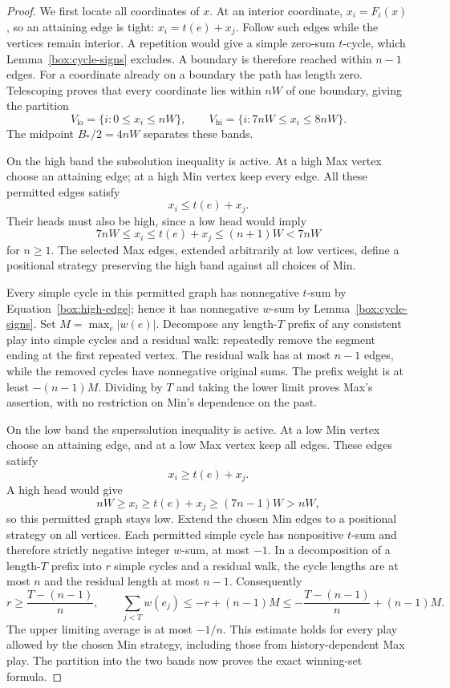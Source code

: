 \begin{proof}
We first locate all coordinates of $x$. At an interior coordinate,
$x_i=F_i(x)$, so an attaining edge is tight: $x_i=t(e)+x_j$. Follow
such edges while the vertices remain interior. A repetition would give
a simple zero-sum $t$-cycle, which Lemma~\ref{box:cycle-signs} excludes.
A boundary is therefore reached within $n-1$ edges. For a coordinate
already on a boundary the path has length zero. Telescoping proves that
every coordinate lies within $nW$ of one boundary, giving the partition
\begin{equation}\label{box:bands}
 V_{\mathrm{lo}}=\{i:0\le x_i\le nW\},\qquad
 V_{\mathrm{hi}}=\{i:7nW\le x_i\le8nW\}.
\end{equation}
The midpoint $B_*/2=4nW$ separates these bands.

On the high band the subsolution inequality is active. At a high Max
vertex choose an attaining edge; at a high Min vertex keep every edge.
All these permitted edges satisfy
\begin{equation}\label{box:high-edge}
 x_i\le t(e)+x_j.
\end{equation}
Their heads must also be high, since a low head would imply
\[
 7nW\le x_i\le t(e)+x_j\le(n+1)W<7nW
\]
for $n\ge1$. The selected Max edges, extended arbitrarily at low
vertices, define a positional strategy preserving the high band against
all choices of Min.

Every simple cycle in this permitted graph has nonnegative $t$-sum by
Equation~\eqref{box:high-edge}; hence it has nonnegative $w$-sum by
Lemma~\ref{box:cycle-signs}. Set $M=\max_e|w(e)|$. Decompose any
length-$T$ prefix of any consistent play into simple cycles and a
residual walk: repeatedly remove the segment ending at the first
repeated vertex. The residual walk has at most $n-1$ edges, while the
removed cycles have nonnegative original sums. The prefix weight is at
least $-(n-1)M$. Dividing by $T$ and taking the lower limit proves
Max's assertion, with no restriction on Min's dependence on the past.

On the low band the supersolution inequality is active. At a low Min
vertex choose an attaining edge, and at a low Max vertex keep all edges.
These edges satisfy
\begin{equation}\label{box:low-edge}
 x_i\ge t(e)+x_j.
\end{equation}
A high head would give
\[
 nW\ge x_i\ge t(e)+x_j\ge(7n-1)W>nW,
\]
so this permitted graph stays low. Extend the chosen Min edges to a
positional strategy on all vertices. Each permitted simple cycle has
nonpositive $t$-sum and therefore strictly negative integer $w$-sum,
at most $-1$. In a decomposition of a length-$T$ prefix into $r$ simple
cycles and a residual walk, the cycle lengths are at most $n$ and the
residual length at most $n-1$. Consequently
\[
 r\ge\frac{T-(n-1)}n,
 \qquad
 \sum_{j<T}w(e_j)\le-r+(n-1)M
 \le-\frac{T-(n-1)}n+(n-1)M.
\]
The upper limiting average is at most $-1/n$. This estimate holds for
every play allowed by the chosen Min strategy, including those from
history-dependent Max play. The partition into the two bands now proves
the exact winning-set formula.
\end{proof}
